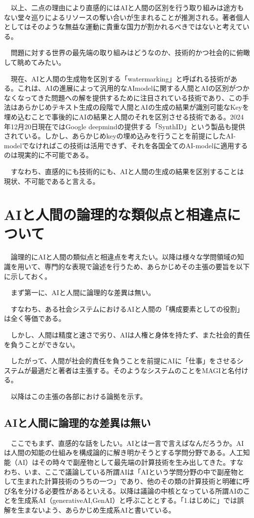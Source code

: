 \documentclass{article}
\begin{document}
　以上、二点の理由により直感的にはAIと人間の区別を行う取り組みは途方もない堂々巡りによるリソースの奪い合いが生まれることが推測される。著者個人としてはそのような無益な運動に貴重な国力が割かれるべきではないと考えている。

　問題に対する世界の最先端の取り組みはどうなのか、技術的かつ社会的に俯瞰して眺めてみたい。

　現在、AIと人間の生成物を区別する「watermarking」と呼ばれる技術がある\cite{arxiv_241118479}。これは、AIの進展によって汎用的なAImodelに関する人間とAIの区別がつかなくなってきた問題への解を提供するために注目されている技術であり\cite{arxiv_241118479}、この手法はあらかじめテキスト生成の段階で人間とAIの生成の結果が識別可能なKeyを埋め込むことで事後的にAIの結果と人間のそれを区別させる技術である。2024年12月20日現在ではGoogle deepmindの提供する「SynthID」\cite{deepmind_synthid}という製品も提供されている。しかし、あらかじめkeyの埋め込みを行うことを前提にしたAI-modelでなければこの技術は活用できず、それを各国全てのAI-modelに適用するのは現実的に不可能である。

　すなわち、直感的にも技術的にも、AIと人間の生成の結果を区別することは現状、不可能であると言える。

\section{AIと人間の論理的な類似点と相違点について}

　論理的にAIと人間の類似点と相違点を考えたい。以降は様々な学問領域の知識を用いて、専門的な表現で論述を行うため、あらかじめその主張の要旨を以下に示しておく。

　まず第一に、AIと人間に論理的な差異は無い。

　すなわち、ある社会システムにおけるAIと人間の「構成要素としての役割」は全く等価である。

　しかし、人間は精度と速さで劣り、AIは人権と身体を持たず、また社会的責任を負うことができない。

　したがって、人間が社会的責任を負うことを前提にAIに「仕事」をさせるシステムが最適だと著者は主張する。そのようなシステムのことをMAGIと名付ける。

　以降はこの主張の各部における論拠を示す。

\subsection{AIと人間に論理的な差異は無い}

　ここでもまず、直感的な話をしたい。AIとは一言で言えばなんだろうか。AIは人間の知能の仕組みを構成論的に解き明かそうとする学問分野である\cite{matsuo2021}。人工知能（AI）はその時々で副産物として最先端の計算技術を生み出してきた\cite{matsuo2021}。すなわち、いま、ここで議論している所謂AIは「AIという学問分野の中で副産物として生まれた計算技術のうちの一つ」であり、他のその類の計算技術と明確に呼び名を分ける必要性があるといえる。以降は議論の中核となっている所謂AIのことを生成系AI（generativeAI,GenAI）と呼ぶこととする。「1.はじめに」では誤解を生まないよう、あらかじめ生成系AIと書いている。
\end{document}

